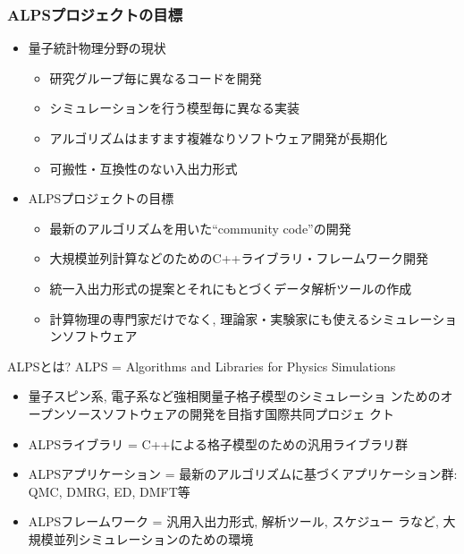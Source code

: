 \begin{frame}
  \frametitle{ALPSプロジェクトの目標}
  \begin{itemize}
    \setlength{\itemsep}{1em}
  \item 量子統計物理分野の現状
    \begin{itemize}
    \item 研究グループ毎に異なるコードを開発
    \item シミュレーションを行う模型毎に異なる実装
    \item アルゴリズムはますます複雑なりソフトウェア開発が長期化
    \item 可搬性・互換性のない入出力形式
    \end{itemize}
  \item ALPSプロジェクトの目標
    \begin{itemize}
    \item 最新のアルゴリズムを用いた``community code''の開発
    \item 大規模並列計算などのためのC++ライブラリ・フレームワーク開発
    \item 統一入出力形式の提案とそれにもとづくデータ解析ツールの作成
    \item 計算物理の専門家だけでなく, 理論家・実験家にも使えるシミュレーションソフトウェア
    \end{itemize}
  \end{itemize}
\end{frame}

\begin{frame}{ALPSとは?}
  ALPS = Algorithms and Libraries for Physics Simulations
      \begin{itemize}
      \item 量子スピン系, 電子系など強相関量子格子模型のシミュレーショ
        ンためのオープンソースソフトウェアの開発を目指す国際共同プロジェ
        クト
        \item ALPSライブラリ = C++による格子模型のための汎用ライブラリ群
        \item ALPSアプリケーション = 最新のアルゴリズムに基づくアプリケーション群: QMC, DMRG, ED, DMFT等
        \item ALPSフレームワーク = 汎用入出力形式, 解析ツール, スケジュー
          ラなど, 大規模並列シミュレーションのための環境
      \end{itemize}
\end{frame}

